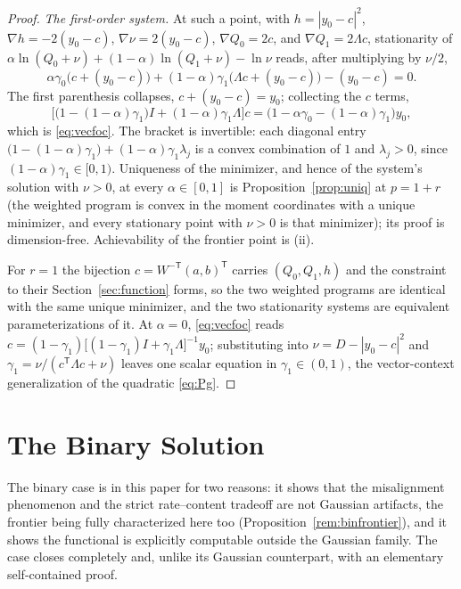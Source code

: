 \documentclass[11pt,onecolumn]{IEEEtran}
\begin{document}
\begin{proof}
\emph{The first-order system.} At such a point, with
$h=|y_0-c|^2$, $\nabla h=-2(y_0-c)$, $\nabla \nu=2(y_0-c)$,
$\nabla Q_0=2c$, and $\nabla Q_1=2\Lambda c$, stationarity of
$\alpha\ln(Q_0+\nu)+(1-\alpha)\ln(Q_1+\nu)-\ln \nu$ reads, after
multiplying by $\nu/2$,
\[
\alpha\gamma_0\bigl(c+(y_0-c)\bigr)
+(1-\alpha)\gamma_1\bigl(\Lambda c+(y_0-c)\bigr)
-(y_0-c)=0 .
\]
The first parenthesis collapses, $c+(y_0-c)=y_0$; collecting the $c$
terms,
\[
\bigl[\bigl(1-(1-\alpha)\gamma_1\bigr)I
+(1-\alpha)\gamma_1\Lambda\bigr]c
=\bigl(1-\alpha\gamma_0-(1-\alpha)\gamma_1\bigr)y_0,
\]
which is \eqref{eq:vecfoc}. The bracket is invertible: each diagonal
entry $\bigl(1-(1-\alpha)\gamma_1\bigr)+(1-\alpha)\gamma_1\lambda_j$
is a convex combination of $1$ and $\lambda_j>0$, since
$(1-\alpha)\gamma_1\in[0,1)$. Uniqueness of the minimizer, and hence
of the system's solution with $\nu>0$, at every $\alpha\in[0,1]$ is
Proposition~\ref{prop:uniq} at $p=1+r$ (the weighted program is convex
in the moment coordinates with a unique minimizer, and every
stationary point with $\nu>0$ is that minimizer); its proof is
dimension-free.
Achievability of the frontier point is (ii).

For $r=1$ the bijection $c=W^{-\mathsf T}(a,b)^{\mathsf T}$ carries
$(Q_0,Q_1,h)$ and the constraint to their Section~\ref{sec:function}
forms, so the two weighted programs are identical with the same unique
minimizer, and the two stationarity systems are equivalent
parameterizations of it. At $\alpha=0$, \eqref{eq:vecfoc} reads
$c=(1-\gamma_1)\bigl[(1-\gamma_1)I+\gamma_1\Lambda\bigr]^{-1}y_0$;
substituting into $\nu=D-|y_0-c|^2$ and
$\gamma_1=\nu/(c^{\mathsf T}\Lambda c+\nu)$ leaves one scalar equation in
$\gamma_1\in(0,1)$, the vector-context generalization of the
quadratic \eqref{eq:Pg}.
\end{proof}

\section{The Binary Solution}
\label{sec:binary}

The binary case is in this paper for two reasons: it shows that the
misalignment phenomenon and the strict rate--content tradeoff are not
Gaussian artifacts, the frontier being fully characterized here too
(Proposition~\ref{rem:binfrontier}), and it shows the functional is
explicitly computable outside the Gaussian family. The case closes
completely and, unlike its Gaussian counterpart, with an elementary
self-contained proof.
\end{document}
